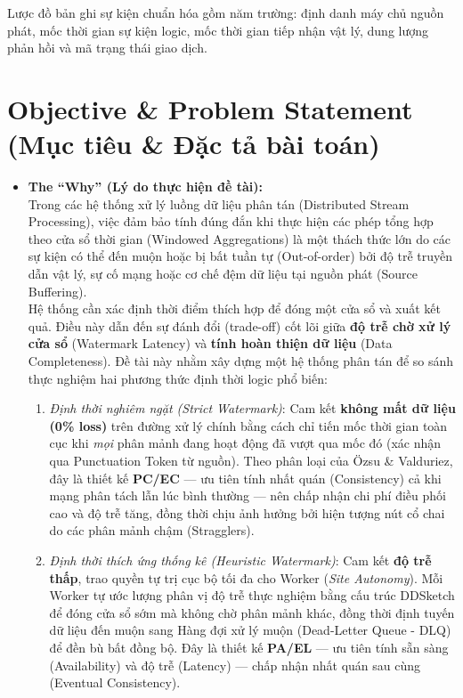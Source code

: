 \documentclass[12pt,a4paper]{article}
\begin{document}
\noindent Lược đồ bản ghi sự kiện chuẩn hóa gồm năm trường: định danh máy chủ nguồn phát, mốc thời gian sự kiện logic, mốc thời gian tiếp nhận vật lý, dung lượng phản hồi và mã trạng thái giao dịch.

\newpage

\vspace{0.5cm}

\section{Objective \& Problem Statement (Mục tiêu \& Đặc tả bài toán)}
\begin{itemize}[leftmargin=*]
    \item \textbf{The ``Why'' (Lý do thực hiện đề tài):} \\
    Trong các hệ thống xử lý luồng dữ liệu phân tán (Distributed Stream Processing), việc đảm bảo tính đúng đắn khi thực hiện các phép tổng hợp theo cửa sổ thời gian (Windowed Aggregations) là một thách thức lớn do các sự kiện có thể đến muộn hoặc bị bất tuần tự (Out-of-order) bởi độ trễ truyền dẫn vật lý, sự cố mạng hoặc cơ chế đệm dữ liệu tại nguồn phát (Source Buffering). \\
    Hệ thống cần xác định thời điểm thích hợp để đóng một cửa sổ và xuất kết quả. Điều này dẫn đến sự đánh đổi (trade-off) cốt lõi giữa \textbf{độ trễ chờ xử lý cửa sổ} (Watermark Latency) và \textbf{tính hoàn thiện dữ liệu} (Data Completeness). Đề tài này nhằm xây dựng một hệ thống phân tán để so sánh thực nghiệm hai phương thức định thời logic phổ biến:
    \begin{enumerate}
        \item \textit{Định thời nghiêm ngặt (Strict Watermark)}: Cam kết \textbf{không mất dữ liệu (0\% loss)} trên đường xử lý chính bằng cách chỉ tiến mốc thời gian toàn cục khi \emph{mọi} phân mảnh đang hoạt động đã vượt qua mốc đó (xác nhận qua Punctuation Token từ nguồn). Theo phân loại của Özsu \& Valduriez, đây là thiết kế \textbf{PC/EC} --- ưu tiên tính nhất quán (Consistency) cả khi mạng phân tách lẫn lúc bình thường --- nên chấp nhận chi phí điều phối cao và độ trễ tăng, đồng thời chịu ảnh hưởng bởi hiện tượng nút cổ chai do các phân mảnh chậm (Stragglers).
        \item \textit{Định thời thích ứng thống kê (Heuristic Watermark)}: Cam kết \textbf{độ trễ thấp}, trao quyền tự trị cục bộ tối đa cho Worker (\emph{Site Autonomy}). Mỗi Worker tự ước lượng phân vị độ trễ thực nghiệm bằng cấu trúc DDSketch để đóng cửa sổ sớm mà không chờ phân mảnh khác, đồng thời định tuyến dữ liệu đến muộn sang Hàng đợi xử lý muộn (Dead-Letter Queue - DLQ) để đền bù bất đồng bộ. Đây là thiết kế \textbf{PA/EL} --- ưu tiên tính sẵn sàng (Availability) và độ trễ (Latency) --- chấp nhận nhất quán sau cùng (Eventual Consistency).
    \end{enumerate}


\end{itemize}
\end{document}
